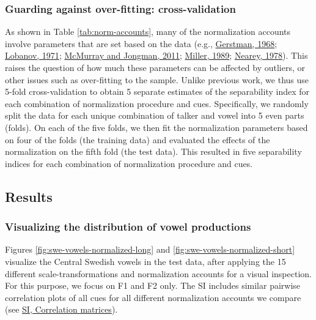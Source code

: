 \documentclass[utf8]{frontiersSCNS}
\begin{document}
\hypertarget{sec:folds}{%
\subsubsection*{Guarding against over-fitting: cross-validation}\label{sec:folds}}

As shown in Table \ref{tab:norm-accounts}, many of the normalization accounts involve parameters that are set based on the data (e.g., \protect\hyperlink{ref-gerstman1968}{Gerstman, 1968}; \protect\hyperlink{ref-lobanov1971}{Lobanov, 1971}; \protect\hyperlink{ref-mcmurray-jongman2011}{McMurray and Jongman, 2011}; \protect\hyperlink{ref-miller1989c}{Miller, 1989}; \protect\hyperlink{ref-nearey1978}{Nearey, 1978}). This raises the question of how much these parameters can be affected by outliers, or other issues such as over-fitting to the sample. Unlike previous work, we thus use 5-fold cross-validation to obtain 5 separate estimates of the separability index for each combination of normalization procedure and cues. Specifically, we randomly split the data for each unique combination of talker and vowel into 5 even parts (folds). On each of the five folds, we then fit the normalization parameters based on four of the folds (the training data) and evaluated the effects of the normalization on the fifth fold (the test data). This resulted in five separability indices for each combination of normalization procedure and cues.

\hypertarget{sec:resultsI}{%
\subsection*{Results}\label{sec:resultsI}}

\hypertarget{sec:normVowelSpace}{%
\subsubsection*{Visualizing the distribution of vowel productions}\label{sec:normVowelSpace}}

Figures \ref{fig:swe-vowels-normalized-long} and \ref{fig:swe-vowels-normalized-short} visualize the Central Swedish vowels in the test data, after applying the 15 different scale-transformations and normalization accounts for a visual inspection. For this purpose, we focus on F1 and F2 only. The SI includes similar pairwise correlation plots of all cues for all different normalization accounts we compare (see \protect\hyperlink{sec:correlation-matrices}{SI, Correlation matrices}).
\end{document}

